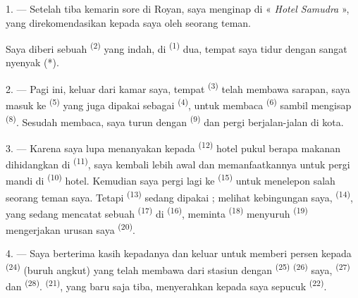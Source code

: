 \VUsaut{3.0mm}
\VUsaut{1.6mm}
\VUsaut{2.0mm}
\VUsaut{3.4mm}

1. --- Setelah tiba kemarin sore di Royan, saya menginap di «
\textit{Hotel Samudra} », yang direkomendasikan kepada saya oleh
seorang teman.

Saya diberi sebuah  \textsuperscript{(2)} yang indah, di
 \textsuperscript{(1)} dua, tempat saya tidur dengan
sangat nyenyak (*).

2. --- Pagi ini, keluar dari kamar saya, tempat 
\textsuperscript{(3)} telah membawa sarapan, saya masuk ke  \textsuperscript{(5)} yang juga dipakai sebagai  \textsuperscript{(4)}, untuk membaca 
\textsuperscript{(6)} sambil mengisap 
\textsuperscript{(8)}. Sesudah membaca, saya turun dengan 
\textsuperscript{(9)} dan pergi berjalan-jalan di kota.

3. --- Karena saya lupa menanyakan kepada 
\textsuperscript{(12)} hotel pukul berapa makanan dihidangkan di
 \textsuperscript{(11)}, saya kembali lebih awal
dan memanfaatkannya untuk pergi mandi di 
\textsuperscript{(10)} hotel. Kemudian saya pergi lagi ke
 \textsuperscript{(15)} untuk menelepon salah seorang
teman saya. Tetapi  \textsuperscript{(13)} sedang
dipakai ; melihat kebingungan saya, 
\textsuperscript{(14)}, yang sedang mencatat sebuah 
\textsuperscript{(17)} di  \textsuperscript{(16)},
meminta  \textsuperscript{(18)} menyuruh
 \textsuperscript{(19)} mengerjakan urusan saya
 \textsuperscript{(20)}.

4. --- Saya berterima kasih kepadanya dan keluar untuk memberi persen
kepada  \textsuperscript{(24)} (buruh angkut) yang telah
membawa dari stasiun dengan 
\textsuperscript{(25)}  \textsuperscript{(26)} saya,
 \textsuperscript{(27)} dan  \textsuperscript{(28)}. 
\textsuperscript{(21)}, yang baru saja tiba, menyerahkan kepada saya
sepucuk  \textsuperscript{(22)}.

